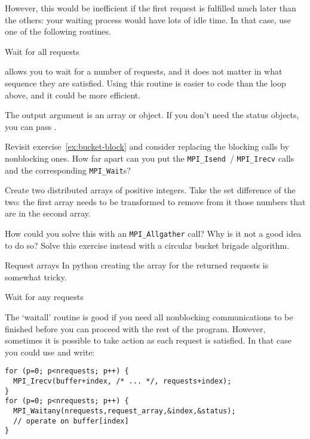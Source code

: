 However, this would be inefficient if the first request is fulfilled
much later than the others: your waiting process would have lots of
idle time. In that case, use one of the following routines.

 {Wait for all requests}
  
 allows you to wait for a number of
requests, and it does not matter in what sequence they are
satisfied. Using this routine is easier to code than the loop above,
and it could be more efficient.
%

The output argument is an array or  object.
If you don't need the status objects, you can pass
.

\begin{exercise}
  \label{ex:bucket-nonblock}
  Revisit exercise~\ref{ex:bucket-block} and consider replacing the
  blocking calls by nonblocking ones. How far apart can you put the
  \lstinline{MPI_Isend}~/ \lstinline{MPI_Irecv} calls and the
  corresponding \lstinline{MPI_Wait}s?
\end{exercise}

\begin{exercise}
  \label{ex:setdiff}
  Create two distributed arrays of positive integers.
  Take the set difference of the two:
  the first array needs to be transformed to remove from it those numbers
  that are in the second array.

  How could you solve this with an \lstinline+MPI_Allgather+ call?
  Why is it not a good idea to do so?
  Solve this exercise instead with a circular bucket brigade algorithm.
\end{exercise}

\begin{pythonnote}{Request arrays}
  In python creating the array for the returned requests is somewhat
  tricky.
\end{pythonnote}

 {Wait for any requests}

The `waitall' routine is good if you need all nonblocking
communications to be finished before you can proceed with the rest of
the program. However, sometimes it is possible to take action as each
request is satisfied. In that case you could use
 and write:

\begin{lstlisting}
for (p=0; p<nrequests; p++) {
  MPI_Irecv(buffer+index, /* ... */, requests+index);
}
for (p=0; p<nrequests; p++) {
  MPI_Waitany(nrequests,request_array,&index,&status);
  // operate on buffer[index]
}
\end{lstlisting}

